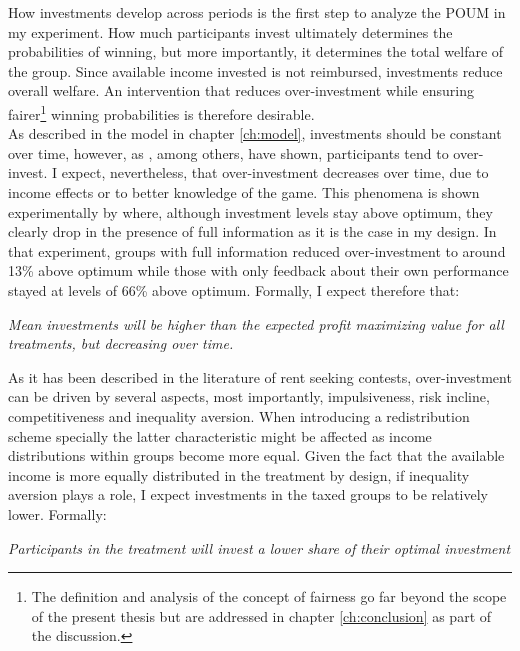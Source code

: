     How investments develop across periods is the first step to analyze the POUM in my experiment. How much participants invest ultimately determines the probabilities of winning, but more importantly, it determines the total welfare of the group. Since available income invested is not reimbursed, investments reduce overall welfare. An intervention that reduces over-investment while ensuring fairer\footnote{The definition and analysis of the concept of fairness go far beyond the scope of the present thesis but are addressed in chapter \ref{ch:conclusion} as part of the discussion.} winning probabilities is therefore desirable.\\
    
    As described in the model in chapter \ref{ch:model}, investments should be constant over time, however, as \cite{sheremeta2016}, among others, have shown, participants tend to over-invest. I expect, nevertheless, that over-investment decreases over time, due to income effects or to better knowledge of the game. This phenomena is shown experimentally by \cite{fallucchi2013} where, although investment levels stay above optimum, they clearly drop in the presence of full information  as it is the case in my design. In that experiment, groups with full information reduced over-investment to around 13\% above optimum while those with only feedback about their own performance stayed at levels of 66\% above optimum. Formally, I expect therefore that:
    
     \begin{hyp} \label{hyp:treat}\textit{Mean investments will be higher than the expected profit maximizing value for all treatments, but decreasing over time.}\end{hyp}
    \hfill\newline 
    As it has been described in the literature of rent seeking contests, over-investment can be driven by several aspects, most importantly, impulsiveness, risk incline, competitiveness and inequality aversion. When introducing a redistribution scheme specially the latter characteristic might be affected as income distributions within groups become more equal. Given the fact that the available income is more equally distributed in the treatment by design, if inequality aversion plays a role, I expect investments in the taxed groups to be relatively lower. Formally:
    
    \begin{hyp} \label{hyp:treat-overinvest}
    \textit{Participants in the treatment will invest a lower share of their optimal investment}
    \end{hyp}
    
